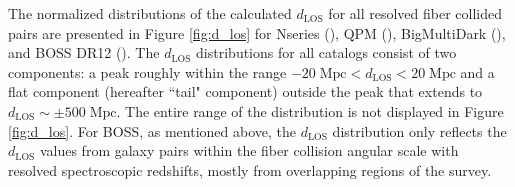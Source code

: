                                                                                                                                                             The normalized distributions of the calculated $d_\mathrm{LOS}$ for all
                                                                                                                                                            resolved fiber collided pairs are presented in Figure \ref{fig:d_los}
                                                                                                                                                            for Nseries (\nseriescolor), QPM (\qpmcolor), BigMultiDark (\bmdcolor), and BOSS DR12 
                                                                                                                                                            (\cmasscolor). The $d_{\mathrm{LOS}}$ distributions for all catalogs 
                                                                                                                                                            consist of two components: a peak roughly within the range $-20\;\mathrm{Mpc} 
                                                                                                                                                            < d_{\mathrm{LOS}} < 20\;\mathrm{Mpc}$ and a flat component (hereafter ``tail" component) 
                                                                                                                                                            outside the peak that extends to $d_{\mathrm{LOS}} \sim \pm 500 \;\mathrm{Mpc}$. The 
                                                                                                                                                            entire range of the distribution is not displayed in Figure \ref{fig:d_los}. 
                                                                                                                                                            For BOSS, as mentioned above, the $d_\mathrm{LOS}$ distribution only reflects the 
                                                                                                                                                            $d_\mathrm{LOS}$ values from galaxy pairs within the fiber collision angular scale 
                                                                                                                                                            with resolved spectroscopic redshifts, mostly from overlapping regions of the survey.

